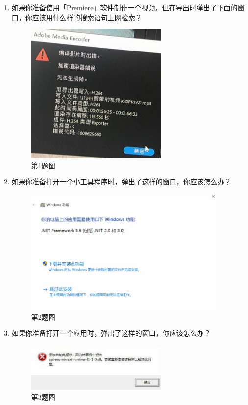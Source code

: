 \begin{enumerate}
  \item 如果你准备使用「Premiere」软件制作一个视频，但在导出时弹出了下面的窗口，你应该用什么样的搜索语句上网检索？
    \begin{figure}[htb!]
      \centering
      \includegraphics[width=7cm]{assets/Q_5_1.jpg}
      \caption{第1题图}
      \label{Q_5_1}
    \end{figure}
  \item 如果你准备打开一个小工具程序时，弹出了这样的窗口，你应该怎么办？
    \begin{figure}[htb!]
      \centering
      \includegraphics[width=10cm]{assets/Q_5_2.jpg}
      \caption{第2题图}
      \label{Q_5_2}
    \end{figure}
  \item 如果你准备打开一个应用时，弹出了这样的窗口，你应该怎么办？
    \begin{figure}[H]
      \centering
      \includegraphics[width=7cm]{assets/Q_5_3.jpg}
      \caption{第3题图}
      \label{Q_5_3}
    \end{figure}
\end{enumerate}